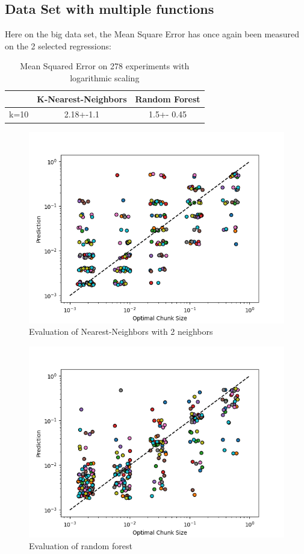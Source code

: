 \documentclass[12pt]{article}
\begin{document}
\subsection{Data Set with multiple functions}

Here on the big data set, the Mean Square Error has once again been measured on the 2 selected regressions:

\begin{table}[h]
	\centering
	\caption{Mean Squared Error on 278 experiments with logarithmic scaling }
	\label{my-label}
	\begin{tabular}{|c|c|c|}
		\hline
		& K-Nearest-Neighbors & Random Forest \\ \hline
		k=10  & 2.18+-1.1        & 1.5+- 0.45 \\ \hline
	\end{tabular}
\end{table}
\begin{figure}[H]
	\centering
	\includegraphics[width=120mm]{images/KNNR_eval_big.png}
	\caption{Evaluation of Nearest-Neighbors with 2 neighbors}
\end{figure}

\begin{figure}[H]
	\centering
	\includegraphics[width=120mm]{images/RFR_eval_big.png}
	\caption{Evaluation of random forest}
\end{figure}
\end{document}
